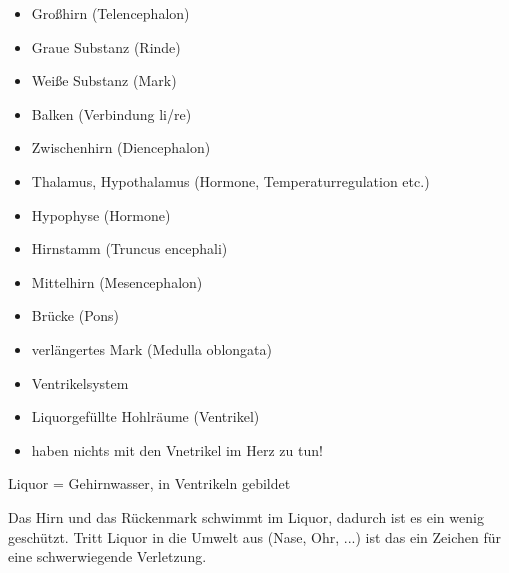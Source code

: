 \documentclass{article}
\begin{document}
\begin{itemize}
\item Gro{\ss}hirn (Telencephalon)

\end{itemize}
\begin{itemize}
\item {}Graue Substanz (Rinde)

\item {}Wei{\ss}e Substanz (Mark)

\item Balken (Verbindung li/re)

\end{itemize}
\begin{itemize}
\item Zwischenhirn  (Diencephalon)

\end{itemize}
\begin{itemize}
\item Thalamus, Hypothalamus (Hormone, Temperaturregulation etc.)

\item Hypophyse (Hormone)

\end{itemize}
\begin{itemize}
\item Hirnstamm (Truncus encephali)

\item Mittelhirn (Mesencephalon)

\item Br\"ucke (Pons)

\item verl\"angertes Mark (Medulla oblongata)

\item Ventrikelsystem

\end{itemize}
\begin{itemize}
\item Liquorgef\"ullte Hohlr\"aume (Ventrikel)

\item haben nichts mit den Vnetrikel im Herz zu tun!

\end{itemize}
Liquor = Gehirnwasser, in Ventrikeln gebildet

Das Hirn und das R\"uckenmark schwimmt im Liquor, dadurch ist es ein
wenig gesch\"utzt. Tritt Liquor in die Umwelt aus (Nase, Ohr, ...)  ist
das ein Zeichen f\"ur eine schwerwiegende Verletzung. 
\end{document}
